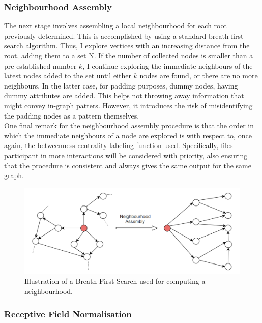 \subsubsection*{Neighbourhood Assembly}

The next stage involves assembling a local neighbourhood for each root previously determined. This is accomplished by using a standard breath-first search algorithm. Thus, I explore vertices with an increasing distance from the root, adding them to a set N. If the number of collected nodes is smaller than a pre-established number $k$, I continue exploring the immediate neighbours of the latest nodes added to the set until either $k$ nodes are found, or there are no more neighbours. In the latter case, for padding purposes, dummy nodes, having dummy attributes are added. This helps not throwing away information that might convey in-graph patters. However, it introduces the risk of misidentifying the padding nodes as a pattern themselves. \\

One final remark for the neighbourhood assembly procedure is that the order in which the immediate neighbours of a node are explored is with respect to, once again, the betweenness centrality labeling function used. Specifically, files participant in more interactions will be considered with priority, also ensuring that the procedure is consistent and always gives the same output for the same graph. 

\begin{figure}[H]
  \centering
  \includegraphics[scale=0.275]{Images/neighassemb2.png}
  \caption{Illustration of a Breath-First Search used for computing a neighbourhood.}
  \label{neighassemb}
\end{figure}


\subsubsection*{Receptive Field Normalisation}

